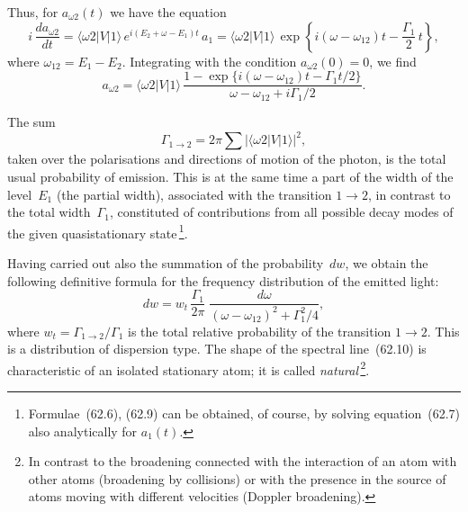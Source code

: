 Thus, for $a_{\omega 2}(t)$ we have the equation
\begin{equation}
i\,\frac{da_{\omega 2}}{dt} = \langle\omega 2|V|1\rangle\,e^{i(E_2+\omega-E_1)t}\,a_1 =
\langle\omega 2|V|1\rangle\,\exp\left\{i(\omega - \omega_{12})t - \frac{\Gamma_1}{2}\,t\right\},
\tag{62.7}
\end{equation}
where $\omega_{12} = E_1 - E_2$. Integrating with the condition $a_{\omega 2}(0) = 0$, we find
\begin{equation}
a_{\omega 2} = \langle\omega 2|V|1\rangle\,\frac{1 - \exp\{i(\omega - \omega_{12})t - \Gamma_1 t/2\}}{\omega - \omega_{12} + i\Gamma_1/2}.
\tag{62.8}
\end{equation}


The sum
\begin{equation}
\Gamma_{1\to 2} = 2\pi\sum|\langle\omega 2|V|1\rangle|^2,
\tag{62.9}
\end{equation}
taken over the polarisations and directions of motion of the photon, is the total usual probability of emission. This is at the same time a part of the width of the level~$E_1$ (the partial width), associated with the transition $1 \to 2$, in contrast to the total width~$\Gamma_1$, constituted of contributions from all possible decay modes of the given quasistationary state\,\footnote{Formulae~(62.6), (62.9) can be obtained, of course, by solving equation~(62.7) also analytically for $a_1(t)$.}.

Having carried out also the summation of the probability~$dw$, we obtain the following definitive formula for the frequency distribution of the emitted light:
\begin{equation}
dw = w_t\,\frac{\Gamma_1}{2\pi}\;\frac{d\omega}{(\omega - \omega_{12})^2 + \Gamma^2_1/4},
\tag{62.10}
\end{equation}
where $w_t = \Gamma_{1\to 2}/\Gamma_1$ is the total relative probability of the transition $1 \to 2$. This is a distribution of dispersion type. The shape of the spectral line~(62.10) is characteristic of an isolated stationary atom; it is called \textit{natural}\,\footnote{In contrast to the broadening connected with the interaction of an atom with other atoms (broadening by collisions) or with the presence in the source of atoms moving with different velocities (Doppler broadening).}.

